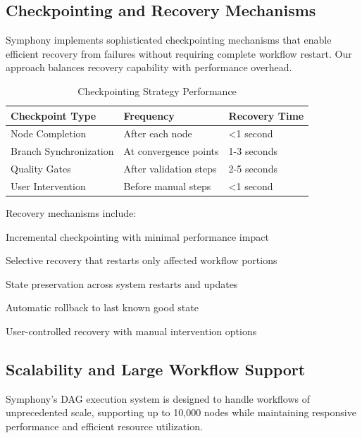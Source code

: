 \subsection*{Checkpointing and Recovery Mechanisms}

Symphony implements sophisticated checkpointing mechanisms that enable efficient recovery from failures without requiring complete workflow restart. Our approach balances recovery capability with performance overhead.

\begin{table}[ht]
\centering
\begin{tabular}{@{}lll@{}}
\toprule
\textbf{Checkpoint Type} & \textbf{Frequency} & \textbf{Recovery Time} \\
\midrule
Node Completion & After each node & <1 second \\
Branch Synchronization & At convergence points & 1-3 seconds \\
Quality Gates & After validation steps & 2-5 seconds \\
User Intervention & Before manual steps & <1 second \\
\bottomrule
\end{tabular}
\caption{Checkpointing Strategy Performance}
\end{table}

Recovery mechanisms include:

\begin{compactlist}
    \item Incremental checkpointing with minimal performance impact
    \item Selective recovery that restarts only affected workflow portions
    \item State preservation across system restarts and updates
    \item Automatic rollback to last known good state
    \item User-controlled recovery with manual intervention options
\end{compactlist}

\subsection*{Scalability and Large Workflow Support}

Symphony's DAG execution system is designed to handle workflows of unprecedented scale, supporting up to 10,000 nodes while maintaining responsive performance and efficient resource utilization.

